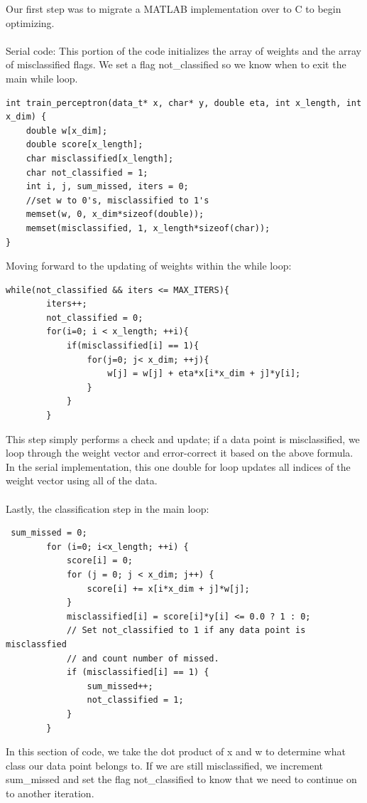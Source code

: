 \documentclass{article}
\begin{document}
Our first step was to migrate a MATLAB implementation over to C to begin optimizing. \\ \\
Serial code:
This portion of the code initializes the array of weights and the array of misclassified flags. We set a flag not\_classified so we know when to exit the main while loop.
\begin{verbatim}
int train_perceptron(data_t* x, char* y, double eta, int x_length, int x_dim) {
    double w[x_dim];
    double score[x_length];
    char misclassified[x_length];
    char not_classified = 1;
    int i, j, sum_missed, iters = 0;
    //set w to 0's, misclassified to 1's
    memset(w, 0, x_dim*sizeof(double));
    memset(misclassified, 1, x_length*sizeof(char));
}
\end{verbatim}
Moving forward to the updating of weights within the while loop:
\begin{verbatim}
while(not_classified && iters <= MAX_ITERS){
        iters++;
        not_classified = 0;
        for(i=0; i < x_length; ++i){
            if(misclassified[i] == 1){
                for(j=0; j< x_dim; ++j){
                    w[j] = w[j] + eta*x[i*x_dim + j]*y[i];
                }
            }
        }
\end{verbatim}
This step simply performs a check and update; if a data point is misclassified, we loop through the weight vector and error-correct it based on the above formula. In the serial implementation, this one double for loop updates all indices of the weight vector using all of the data.
\\ \\
Lastly, the classification step in the main loop:
\begin{verbatim}
 sum_missed = 0;
        for (i=0; i<x_length; ++i) {
            score[i] = 0;
            for (j = 0; j < x_dim; j++) {
                score[i] += x[i*x_dim + j]*w[j];
            }
            misclassified[i] = score[i]*y[i] <= 0.0 ? 1 : 0;
            // Set not_classified to 1 if any data point is misclassfied
            // and count number of missed.
            if (misclassified[i] == 1) {
                sum_missed++;
                not_classified = 1;
            }
        }
\end{verbatim}
In this section of code, we take the dot product of x and w to determine what class our data point belongs to. If we are still misclassified, we increment sum\_missed and set the flag not\_classified to know that we need to continue on to another iteration.
\\ \\
\end{document}
